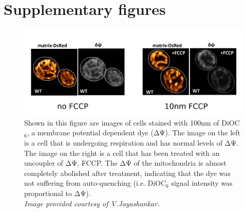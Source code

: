 
\appendix
\chapter{Supplementary figures}
\begin{figure}[htp]
		\centering
	    \includegraphics[width=\textwidth]{fccp}
	    \caption{Shown in this figure are images of cells stained with 100nm of DiOC$_6$, a membrane potential dependent dye (ΔΨ). The image on the left is a cell that is undergoing respiration and has normal levels of ΔΨ. The image on the right is a cell that has been treated with an uncoupler of ΔΨ, FCCP. The ΔΨ of the mitochondria is almost completely abolished after treatment, indicating that the dye was not suffering from auto-quenching (i.e. DiOC$_6$ signal intensity was proportional to ΔΨ).\\[2ex]\emph{Image provided courtesy of V.Jayashankar.}}\label{fig:fccp}
\end{figure}
%
%
